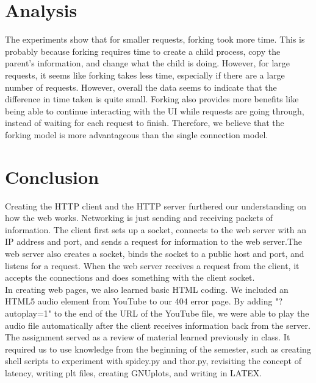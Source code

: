 \documentclass{article}
\begin{document}
\section*{Analysis}
The experiments show that for smaller requests, forking took more time. This is probably because forking requires time to create a child process, copy the parent's information, and change what the child is doing. However, for large requests, it seems like forking takes less time, especially if there are a large number of requests. However, overall the data seems to indicate that the difference in time taken is quite small. Forking also provides more benefits like being able to continue interacting with the UI while requests are going through, instead of waiting for each request to finish. Therefore, we believe that the forking model is more advantageous than the single connection model.

\section*{Conclusion}

Creating the HTTP client and the HTTP server furthered our understanding on how the web works. Networking is just sending and receiving packets of information. The client first sets up a socket, connects to the web server with an IP address and port, and sends a request for information to the web server.The web server also creates a socket, binds the socket to a public host and port, and listens for a request. When the web server receives a request from the client, it accepts the connections and does something with the client socket. \\

\noindent In creating web pages, we also learned basic HTML coding. We included an HTML5 audio element from YouTube to our 404 error page. By adding "?autoplay=1" to the end of the URL of the YouTube file, we were able to play the audio file automatically after the client receives information back from the server. \\

\noindent The assignment served as a review of material learned previously in class. It required us to use knowledge from the beginning of the semester, such as creating shell scripts to experiment with spidey.py and thor.py, revisiting the concept of latency, writing plt files, creating GNUplots, and writing in LATEX. 
\end{document}
